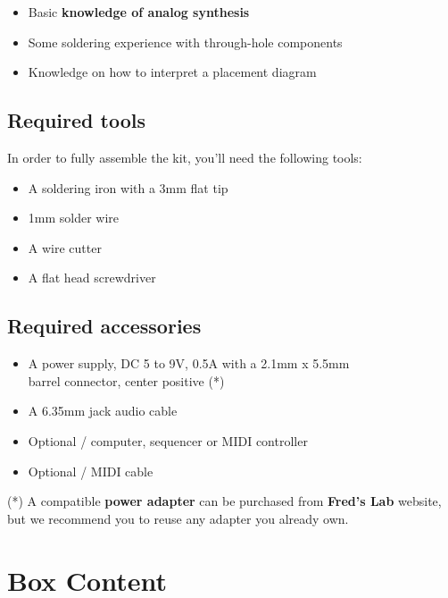 \documentclass{scrartcl}
\begin{document}
\begin{itemize}
    \item Basic \textbf{knowledge of analog synthesis}
    \item Some soldering experience with through-hole components
    \item Knowledge on how to interpret a placement diagram
\end{itemize}

\subsection{Required tools}

In order to fully assemble the kit, you'll need the following tools:

\begin{itemize}
    \item A soldering iron with a 3mm flat tip
    \item 1mm solder wire
    \item A wire cutter
    \item A flat head screwdriver
\end{itemize}

\subsection{Required accessories}

\begin{itemize}
    \item A power supply, DC 5 to 9V, 0.5A with a 2.1mm x 5.5mm \\
          barrel connector, center positive (*)
    \item A 6.35mm jack audio cable
    \item Optional / computer, sequencer or MIDI controller
    \item Optional / MIDI cable
\end{itemize}

(*) A compatible \textbf{power adapter} can be purchased from \textbf{Fred's Lab} website, \\
but we recommend you to reuse any adapter you already own.

\pagebreak
\section{Box Content}
\end{document}
